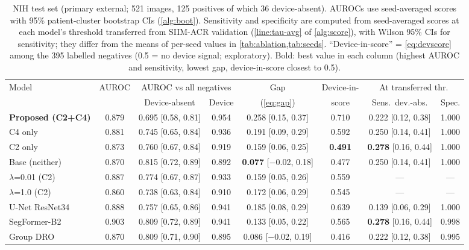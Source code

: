 \documentclass{ieeeaccess}
\newcommand{\ci}[2]{\scriptsize[#1, #2]}
\begin{document}
\begin{table}[!t]
\centering\small
\setlength{\tabcolsep}{3.5pt}
\caption{NIH test set (primary external; 521 images, 125 positives of which 36 device-absent). AUROCs use seed-averaged scores with 95\% patient-cluster bootstrap CIs (\cref{alg:boot}). Sensitivity and specificity are computed from seed-averaged scores at each model's threshold transferred from SIIM-ACR validation (\cref{line:tau-avg} of \cref{alg:score}), with Wilson 95\% CIs for sensitivity; they differ from the means of per-seed values in \cref{tab:ablation,tab:seeds}. ``Device-in-score'' = \cref{eq:devscore} among the 395 labelled negatives (0.5 = no device signal; exploratory). Bold: best value in each column (highest AUROC and sensitivity, lowest gap, device-in-score closest to 0.5).}
\label{tab:nih}
\begin{tabular}{@{}l c c c c c c c@{}}
\toprule
Model & AUROC & \multicolumn{2}{c}{AUROC vs all negatives} & Gap & Device-in- & \multicolumn{2}{c}{At transferred thr.} \\
\cmidrule(lr){3-4}\cmidrule(l){7-8}
 & & Device-absent & Device & (\cref{eq:gap}) & score & Sens.\ dev.-abs. & Spec. \\
\midrule
\rowcolor{band}\textbf{Proposed (C2+C4)} & 0.879 & 0.695 \ci{0.58}{0.81} & 0.954 & 0.258 \ci{0.15}{0.37} & 0.710 & 0.222 \ci{0.12}{0.38} & 1.000 \\
C4 only & 0.881 & 0.745 \ci{0.65}{0.84} & 0.936 & 0.191 \ci{0.09}{0.29} & 0.592 & 0.250 \ci{0.14}{0.41} & 1.000 \\
C2 only & 0.873 & 0.760 \ci{0.67}{0.84} & 0.919 & 0.159 \ci{0.06}{0.25} & \textbf{0.491} & \textbf{0.278} \ci{0.16}{0.44} & 1.000 \\
Base (neither) & 0.870 & 0.815 \ci{0.72}{0.89} & 0.892 & \textbf{0.077} \ci{$-$0.02}{0.18} & 0.477 & 0.250 \ci{0.14}{0.41} & 1.000 \\
$\lambda$=0.01 (C2) & 0.887 & 0.774 \ci{0.67}{0.87} & 0.933 & 0.159 \ci{0.05}{0.26} & 0.559 & --- & --- \\
$\lambda$=1.0 (C2) & 0.860 & 0.738 \ci{0.63}{0.84} & 0.910 & 0.172 \ci{0.06}{0.29} & 0.545 & --- & --- \\
\midrule
U-Net ResNet34 & 0.888 & 0.757 \ci{0.65}{0.86} & 0.941 & 0.185 \ci{0.08}{0.29} & 0.639 & 0.139 \ci{0.06}{0.29} & 1.000 \\
SegFormer-B2 & 0.903 & 0.809 \ci{0.72}{0.89} & 0.941 & 0.133 \ci{0.05}{0.22} & 0.565 & \textbf{0.278} \ci{0.16}{0.44} & 0.998 \\
Group DRO & 0.870 & 0.809 \ci{0.71}{0.90} & 0.895 & 0.086 \ci{$-$0.02}{0.19} & 0.416 & 0.222 \ci{0.12}{0.38} & 0.995 \\

\end{tabular}
\end{table}
\end{document}
